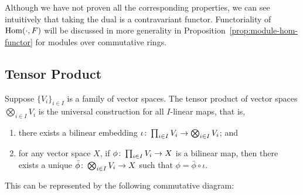 \begin{remark}
    Although we have not proven all the corresponding properties,
    we can see intuitively that taking the dual is a contravariant functor.
    Functoriality of \(\operatorname{Hom}(\cdot,F)\) will be discussed in more generality
    in Proposition~\ref{prop:module-hom-functor} for modules over commutative rings.
\end{remark}
    

\subsection*{Tensor Product}

\begin{definition}
    Suppose \({\{V_i\}}_{i \in I}\) is a family of vector spaces.
    The tensor product of vector spaces \(\bigotimes_{i \in I} V_i\)
    is the universal construction for all \(I\)-linear maps, that is,
    \begin{enumerate}[label={(\roman*)}, itemsep=0mm]
        \item there exists a bilinear embedding \(\iota\colon\prod_{i \in I} V_i\to\bigotimes_{i \in I} V_i\); and
        \item for any vector space \(X\),
            if \(\phi\colon\prod_{i \in I} V_i\to X\) is a bilinear map,
            then there exists a unique \(\bar{\phi}\colon\bigotimes_{i \in I} V_i\to X\)
            such that \(\phi = \bar{\phi}\circ\iota\).
    \end{enumerate}

    This can be represented by the following commutative diagram:
    \begin{center}
    \end{center}
\end{definition}

